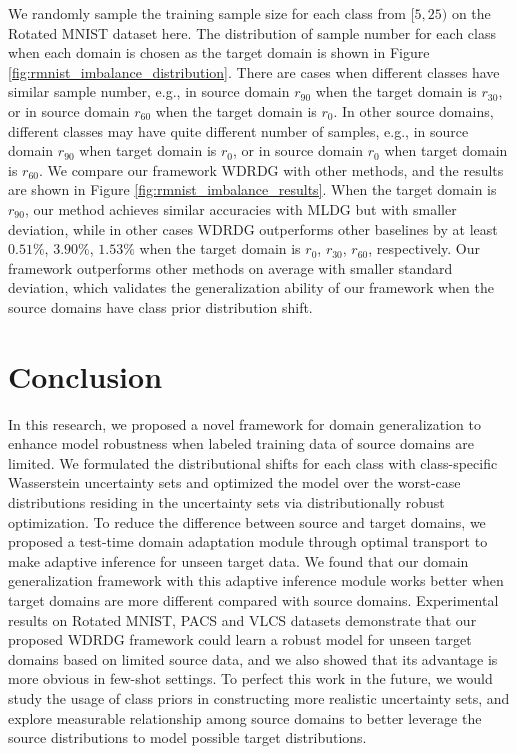 \documentclass[journal]{IEEEtran}
\begin{document}
We randomly sample the training sample size for each class from $[5,25)$ on the Rotated MNIST dataset here. The distribution of sample number for each class when each domain is chosen as the target domain is shown in Figure \ref{fig:rmnist_imbalance_distribution}.
There are cases when different classes have similar sample number, e.g., in source domain $r_{90}$ when the target domain is $r_{30}$, or in source domain $r_{60}$ when the target domain is $r_{0}$.  
In other source domains, different classes may have quite different number of samples, e.g., in source domain $r_{90}$ when target domain is $r_{0}$, or in source domain $r_{0}$ when target domain is $r_{60}$.
We compare our framework WDRDG with other methods, and the results are shown in Figure \ref{fig:rmnist_imbalance_results}.
When the target domain is $r_{90}$, our method achieves similar accuracies with MLDG but with smaller deviation, while in other cases WDRDG outperforms other baselines by at least
$0.51\%$, $3.90\%$, $1.53\%$ when the target domain is $r_{0}$, $r_{30}$, $r_{60}$, respectively. 
Our framework outperforms other methods on average with smaller standard deviation, which validates the generalization ability of our framework when the source domains have class prior distribution shift. 



\section{Conclusion}
In this research, we proposed a novel framework for domain generalization to enhance model robustness when labeled training data of source domains are limited.
We formulated the distributional shifts for each class with class-specific Wasserstein uncertainty sets and optimized the model over the worst-case distributions residing in the uncertainty sets via distributionally robust optimization. 
To reduce the difference between source and target domains, we proposed a test-time domain adaptation module through optimal transport to make adaptive inference for unseen target data. We found that our domain generalization framework with this adaptive inference module works better when target domains are more different compared with source domains. 
Experimental results on Rotated MNIST, PACS and VLCS datasets demonstrate that our proposed WDRDG framework could learn a robust model for unseen target domains based on limited source data, and we also showed that its advantage is more obvious in few-shot settings. 
To perfect this work in the future,  we would study the usage of class priors in constructing more realistic uncertainty sets, and explore measurable relationship among source domains to better leverage the source distributions to model possible target distributions. 
\end{document}
